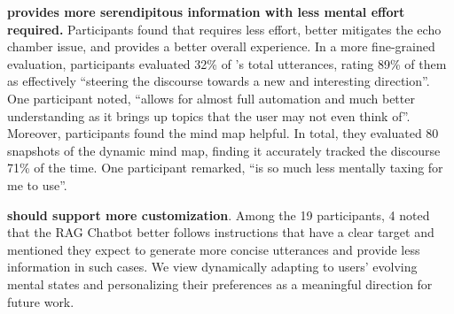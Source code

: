 \documentclass[11pt]{article}
\begin{document}
\noindent
\textbf{\system provides more serendipitous information with less mental effort required.}\quad
Participants found that \system requires less effort, better mitigates the echo chamber issue, and provides a better overall experience. In a more fine-grained evaluation, participants evaluated 32\% of \system’s total utterances, rating 89\%
of them as effectively ``steering the discourse towards a new and interesting direction''. %
One participant noted, ``\system allows for almost full automation and much better understanding as it brings up topics that the user may not even think of''. Moreover, participants found the mind map helpful. %
In total, they evaluated 80 snapshots of the dynamic mind map, %
finding it accurately tracked the discourse 71\%
of the time. One participant remarked, ``\system is so much less mentally taxing for me to use''.



\noindent
\textbf{\system should support more customization}.\quad
Among the 19 participants, 4 noted that the RAG Chatbot better follows instructions that have a clear target and mentioned they expect \system to generate more concise utterances and provide less information in such cases. 
We view dynamically adapting \system to users’ evolving mental states and personalizing their preferences as a meaningful direction for future work.
\end{document}
